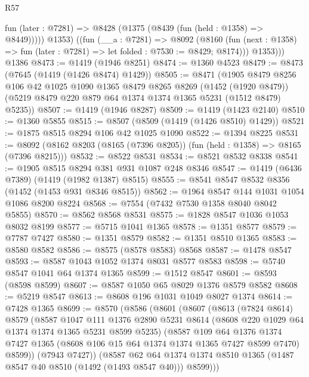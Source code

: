 \begin{lexlean}{R57}
\begin{coremodule}
          fun (later : @7281) => @8428 (@1375 (@8439 (fun (held : @1358) => @8449)))))
          @1353)
        ((fun (__a : @7281) =>
        @8092
          (@8160 (fun (next : @1358) => fun (later : @7281) => let folded : @7530 := @8429; @8174)))
          @1353)))
    @1386
@8473 := @1419 (@1946 @8251)
@8474 := @1360 @4523
@8479 := @8473 (@7645 (@1419 (@1426 @8474) @1429))
@8505 := @8471
    (@1905
      @8479
      @8256
      @106
      @42
      @1025
      @1090
      @1365
      @8479
      @8265
      @8269
      (@1452 (@1920 @8479))
      (@5219 @8479 @220 @879 @64 @1374 @1374 @1365 @5231 (@1512 @8479) @5235))
@8507 := @1419 (@1946 @8287)
@8509 := @1419 (@1423 @2140)
@8510 := @1360 @5855
@8515 := @8507 (@8509 (@1419 (@1426 @8510) @1429))
@8521 := @1875 @8515 @8294 @106 @42 @1025 @1090
@8522 := @1394 @8225
@8531 := @8092 (@8162 @8203 (@8165 (@7396 @8205)) (fun (held : @1358) => @8165 (@7396 @8215)))
@8532 := @8522 @8531
@8534 := @8521 @8532 @8338
@8541 := @1905 @8515 @8294 @381 @931 @1087 @248 @8346
@8547 := @1419 (@6436 @7389) (@1419 (@1982 @1387) @8515)
@8555 := @8541 @8547 @8532 @8356 (@1452 (@1453 @931 @8346 @8515))
@8562 := @1964 @8547 @144 @1031 @1054 @1086 @8200 @8224
@8568 := @7554 (@7432 @7530 @1358 @8040 @8042 @5855)
@8570 := @8562 @8568 @8531
@8575 := @1828 @8547 @1036 @1053 @8032 @8199
@8577 := @5715 @1041 @1365
@8578 := @1351 @8577
@8579 := @7787 @7427
@8580 := @1351 @8579
@8582 := @1351 @8510 @1365
@8583 := @8580 @8582
@8586 := @8575 (@8578 @8583) @8568
@8587 := @1478 @8547
@8593 := @8587 @1043 @1052 @1374 @8031 @8577 @8583
@8598 := @5740 @8547 @1041 @64 @1374 @1365
@8599 := @1512 @8547
@8601 := @8593 (@8598 @8599)
@8607 := @8587 @1050 @65 @8029 @1376 @8579 @8582
@8608 := @5219 @8547
@8613 := @8608 @196 @1031 @1049 @8027 @1374
@8614 := @7428 @1365
@8699 := @8570
    (@8586
      (@8601
        (@8607
          (@8613
            (@7824 @8614)
            @8579
            (@8587
              @1047
              @111
              @1376
              @2890
              @5231
              @8614
              (@8608 @220 @1029 @64 @1374 @1374 @1365 @5231 @8599 @5235)
              (@8587
                @109
                @64
                @1376
                @1374
                @7427
                @1365
                (@8608 @106 @15 @64 @1374 @1374 @1365 @7427 @8599 @7470)
                @8599))
            (@7943 @7427))
          (@8587
            @62
            @64
            @1374
            @1374
            @8510
            @1365
            (@1487 @8547 @40 @8510 (@1492 (@1493 @8547 @40)))
            @8599)))

\end{coremodule}
\end{lexlean}
